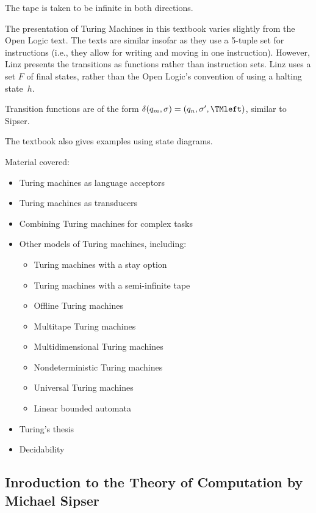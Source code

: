 \documentclass[../../include/open-logic-section]{subfiles}
\begin{document}
The tape is taken to be infinite in both directions. 

The presentation of Turing Machines in this textbook varies slightly from the Open Logic text. The texts are similar insofar as they use a 5-tuple set for instructions (i.e., they allow for writing and moving in one instruction). However, Linz presents the transitions as functions rather than instruction sets. Linz uses a set $F$ of final states, rather than the Open Logic's convention of using a halting state~$h$. 

Transition functions are of the form $\delta(q_m, \sigma) = (q_n, \sigma', \TMleft)$, similar to Sipser.

The textbook also gives examples using state diagrams.

Material covered:
\begin{itemize}
\item Turing machines as language acceptors
\item Turing machines as transducers
\item Combining Turing machines for complex tasks
\item Other models of Turing machines, including:
\begin{itemize}
\item Turing machines with a stay option
\item Turing machines with a semi-infinite tape
\item Offline Turing machines
\item Multitape Turing machines
\item Multidimensional Turing machines
\item Nondeterministic Turing machines
\item Universal Turing machines
\item Linear bounded automata
\end{itemize}
\item Turing's thesis
\item Decidability
\end{itemize}

\subsection{Inroduction to the Theory of Computation by Michael Sipser}
\end{document}
